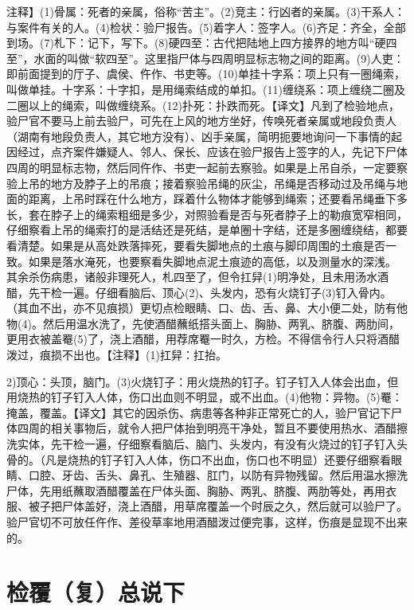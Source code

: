 \documentclass[12pt,UTF8]{ctexbook}
\begin{document}
注释】(1)骨属：死者的亲属，俗称“苦主”。(2)竞主：行凶者的亲属。(3)干系人：与案件有关的人。(4)检状：验尸报告。(5)着字人：签字人。(6)齐足：齐全，全部到场。(7)札下：记下，写下。(8)硬四至：古代把陆地上四方接界的地方叫“硬四至”，水面的叫做“软四至”。这里指尸体与四周明显标志物之间的距离。(9)人吏：即前面提到的厅子、虞侯、仵作、书吏等。(10)单挂十字系：项上只有一圈绳索，叫做单挂。十字系：十字扣，是用绳索结成的单扣。(11)缠绕系：项上缠绕二圈及二圈以上的绳索，叫做缠绕系。(12)扑死：扑跌而死。【译文】凡到了检验地点，验尸官不要马上前去验尸，可先在上风的地方坐好，传唤死者亲属或地段负责人（湖南有地段负责人，其它地方没有）、凶手亲属，简明扼要地询问一下事情的起因经过，点齐案件嫌疑人、邻人、保长、应该在验尸报告上签字的人，先记下尸体四周的明显标志物，然后同仵作、书吏一起前去察验。如果是上吊自杀，一定要察验上吊的地方及脖子上的吊痕；接着察验吊绳的灰尘，吊绳是否移动过及吊绳与地面的距离，上吊时踩在什么地方，踩着什么物体才能够到绳索；还要看吊绳垂下多长，套在脖子上的绳索粗细是多少，对照验看是否与死者脖子上的勒痕宽窄相同，仔细察看上吊的绳索打的是活结还是死结，是单圈十字结，还是多圈缠绕结，都要看清楚。如果是从高处跌落摔死，要看失脚地点的土痕与脚印周围的土痕是否一致。如果是落水淹死，也要察看失脚地点泥土痕迹的高低，以及测量水的深浅。
其余杀伤病患，诸般非理死人，札四至了，但令扛舁(1)明净处，且未用汤水酒醋，先干检一遍。仔细看脑后、顶心(2)、头发内，恐有火烧钉子(3)钉入骨内。（其血不出，亦不见痕损）更切点检眼睛、口、齿、舌、鼻、大小便二处，防有他物(4)。然后用温水洗了，先使酒醋蘸纸搭头面上、胸胁、两乳、脐腹、两肋间，更用衣被盖罨(5)了，浇上酒醋，用荐席罨一时久，方检。不得信令行人只将酒醋泼过，痕损不出也。【注释】(1)扛舁：扛抬。

2)顶心：头顶，脑门。(3)火烧钉子：用火烧热的钉子。钉子钉入人体会出血，但用烧热的钉子钉入人体，伤口出血则不明显，或不出血。(4)他物：异物。(5)罨：掩盖，覆盖。【译文】其它的因杀伤、病患等各种非正常死亡的人，验尸官记下尸体四周的相关事物后，就令人把尸体抬到明亮干净处，暂且不要使用热水、酒醋擦洗实体，先干检一遍，仔细察看脑后、脑门、头发内，有没有火烧过的钉子钉入头骨的。（凡是烧热的钉子钉入人体，伤口不出血，伤口也不明显）还要仔细察看眼睛、口腔、牙齿、舌头、鼻孔、生殖器、肛门，以防有异物残留。然后用温水擦洗尸体，先用纸蘸取酒醋覆盖在尸体头面、胸胁、两乳、脐腹、两肋等处，再用衣服、被子把尸体盖好，浇上酒醋，用草席覆盖一个时辰之久，然后就可以验尸了。验尸官切不可放任仵作、差役草率地用酒醋泼过便完事，这样，伤痕是显现不出来的。

\chapter{检覆（复）总说下}
\end{document}
